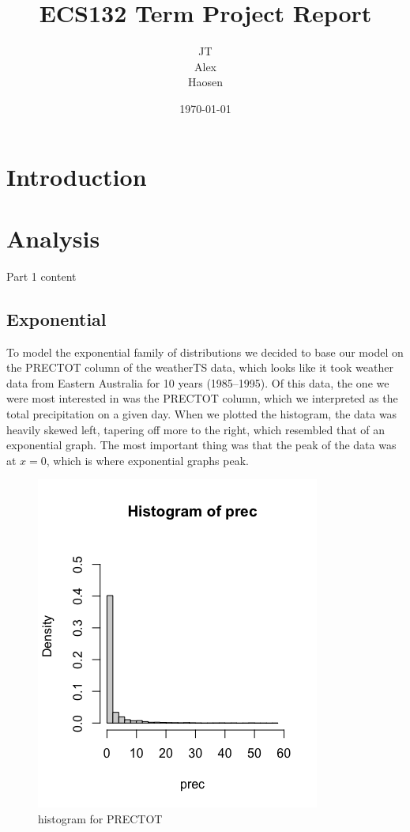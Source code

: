 \documentclass[12pt, a4paper, oneside]{report}
\title{ECS132 Term Project Report}
\author{JT\\Alex\\Haosen}
\date{\today}
\begin{document}
\maketitle
\tableofcontents
\newpage

\chapter{Introduction}

\newpage





\chapter{Analysis}
Part 1 content
\newpage




\section{Exponential}
To model the exponential family of distributions we decided to base our model on the PRECTOT column of the weatherTS data, which looks like it took weather data from Eastern Australia for 10 years (1985--1995).
Of this data, the one we were most interested in was the PRECTOT column, which we interpreted as the total precipitation on a given day.
When we plotted the histogram, the data was heavily skewed left, tapering off more to the right, which resembled that of an exponential graph.
The most important thing was that the peak of the data was at \(x = 0\), which is where exponential graphs peak.

\begin{figure}[h]
    \centering
    \includegraphics[scale=0.5]{images/HistOriginal.png}
    \caption{histogram for PRECTOT}
\end{figure}
\end{document}
